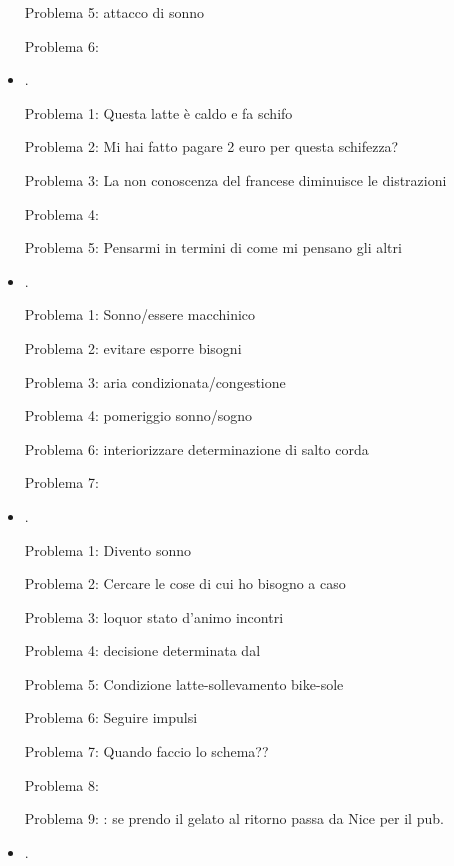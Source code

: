 \begin{itemize}
Problema 5: attacco di sonno

Problema 6: 

\item {}.

Problema 1: Questa latte è caldo e fa schifo

Problema 2: Mi hai fatto pagare 2 euro per questa schifezza?

Problema 3: La non conoscenza del francese diminuisce le distrazioni

Problema 4: 

Problema 5: Pensarmi in termini di come mi pensano gli altri

\item {}.

Problema 1: Sonno/essere macchinico

Problema 2: evitare esporre bisogni

Problema 3: aria condizionata/congestione

Problema 4: pomeriggio sonno/sogno

Problema 6: interiorizzare determinazione di salto corda

Problema 7: 

\item {}.

Problema 1: Divento sonno

Problema 2: Cercare le cose di cui ho bisogno a caso

Problema 3: loquor stato d'animo incontri

Problema 4: decisione determinata dal 

Problema 5: Condizione latte-sollevamento bike-sole

Problema 6: Seguire impulsi 

Problema 7: Quando faccio lo schema??

Problema 8: 

Problema 9: : se prendo il gelato al ritorno passa da Nice per il pub.


\item {}.


\end{itemize}
